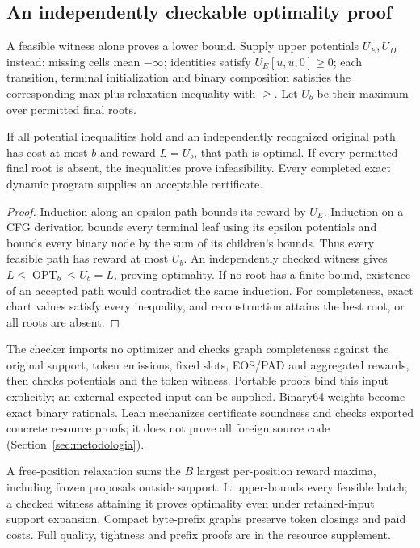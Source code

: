 \subsection{An independently checkable optimality proof}

A feasible witness alone proves a lower bound. Supply upper potentials $U_E,U_D$ instead: missing cells mean $-\infty$; identities satisfy $U_E[u,u,0]\geq0$; each transition, terminal initialization and binary composition satisfies the corresponding max-plus relaxation inequality with $\geq$. Let $U_b$ be their maximum over permitted final roots.

\begin{theorem}
If all potential inequalities hold and an independently recognized original path has cost at most $b$ and reward $L=U_b$, that path is optimal. If every permitted final root is absent, the inequalities prove infeasibility. Every completed exact dynamic program supplies an acceptable certificate.
\label{thm:budget-certificate}
\end{theorem}
\begin{proof}
Induction along an epsilon path bounds its reward by $U_E$. Induction on a CFG derivation bounds every terminal leaf using its epsilon potentials and bounds every binary node by the sum of its children's bounds. Thus every feasible path has reward at most $U_b$. An independently checked witness gives $L\leq\operatorname{OPT}_b\leq U_b=L$, proving optimality. If no root has a finite bound, existence of an accepted path would contradict the same induction. For completeness, exact chart values satisfy every inequality, and reconstruction attains the best root, or all roots are absent.
\end{proof}

The checker imports no optimizer and checks graph completeness against the original support, token emissions, fixed slots, EOS/PAD and aggregated rewards, then checks potentials and the token witness. Portable proofs bind this input explicitly; an external expected input can be supplied. Binary64 weights become exact binary rationals. Lean mechanizes certificate soundness and checks exported concrete resource proofs; it does not prove all foreign source code (Section~\ref{sec:metodologia}).

A free-position relaxation sums the $B$ largest per-position reward maxima,
including frozen proposals outside support. It upper-bounds every feasible batch;
a checked witness attaining it proves optimality even under retained-input support
expansion. Compact byte-prefix graphs preserve token closings and paid costs.
Full quality, tightness and prefix proofs are in the resource supplement.

